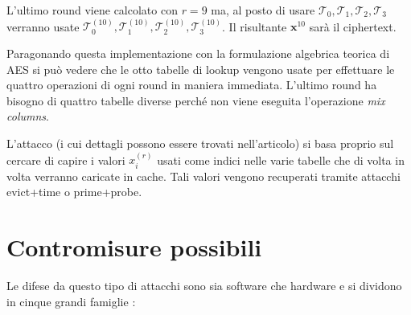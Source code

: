 				L'ultimo round viene calcolato con $r = 9$ ma, al posto di usare $\mathcal{T}_0, \mathcal{T}_1, \mathcal{T}_2, \mathcal{T}_3$ verranno usate $\mathcal{T}_{0}^{(10)}, \mathcal{T}_{1}^{(10)}, \mathcal{T}_{2}^{(10)}, \mathcal{T}_{3}^{(10)}$. Il risultante $\mathbf{x}^{10}$ sarà il ciphertext.
				
				Paragonando questa implementazione con la formulazione algebrica teorica di \ac{AES} si può vedere che le otto tabelle di lookup vengono usate per effettuare le quattro operazioni di ogni round in maniera immediata. L'ultimo round ha bisogno di quattro tabelle diverse perché non viene eseguita l'operazione \emph{mix columns}.
				
				L'attacco (i cui dettagli possono essere trovati nell'articolo) si basa proprio sul cercare di capire i valori $x_{i}^{(r)}$ usati come indici nelle varie tabelle che di volta in volta verranno caricate in cache. Tali valori vengono recuperati tramite attacchi evict+time o prime+probe.
		
		\section{Contromisure possibili}
			Le difese da questo tipo di attacchi sono sia software che hardware e si dividono in cinque grandi famiglie \cite{ge2016survey}:
			
